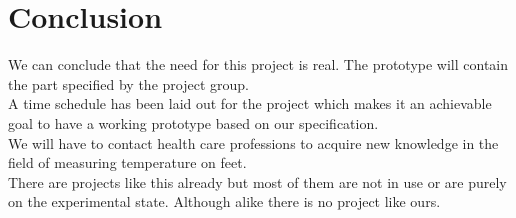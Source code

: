 \chapter{Conclusion}
We can conclude that the need for this project is real. The prototype will contain the part specified by the project group.\\
A time schedule has been laid out for the project which makes it an achievable goal to have a working prototype based on our specification.\\
We will have to contact health care professions to acquire new knowledge in the field of measuring temperature on feet.\\
There are projects like this already but most of them are not in use or are purely on the experimental state. Although alike there is no project like ours.\\